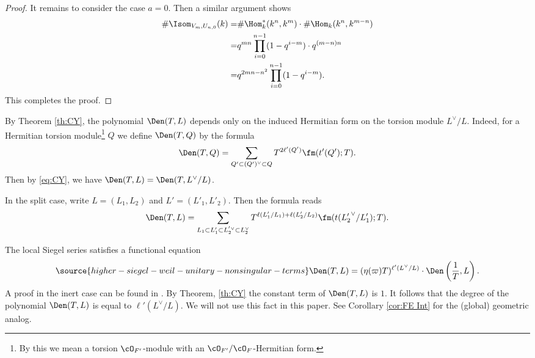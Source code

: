 \begin{proof}
It remains to consider the case $a=0$. Then  a similar argument shows
   \begin{align*}
 \# \Isom_{V_{m}, U_{n,0}}(k)= &\#\Hom^*_k(k^n,k^m)\cdot  \#\Hom_k(k^n,k^{m-n})\\
 =&q^{mn}\prod_{i=0}^{n-1}(1-q^{i-m})\cdot  q^{(m-n)n}
 \\=&  q^{2mn-n^2}\prod_{i=0}^{n-1}(1-q^{i-m}).
  \end{align*}
  This completes the proof.

 \end{proof}

 \begin{remark}
\notready\label{r:Den tor} By Theorem \ref{th:CY}, the polynomial $\Den(T,L)$ depends only on the induced Hermitian form on the torsion module $L^\vee/L$. Indeed, for a Hermitian torsion module\footnote{By this we mean a torsion $\cO_{F'}$-module with an $\cO_{F'}/\cO_F$-Hermitian form.} $Q$ we define $\Den(T,Q)$ by the formula
\[
\Den(T,Q) = \sum_{Q'\subset (Q')^{\vee} \subset Q} T^{2\ell'(Q')}\fm(  t'(Q');T).
\]
Then by \eqref{eq:CY}, we have $\Den(T, L) = \Den(T, L^\vee/L)$.
\end{remark}

\begin{remark}
\notready
In the split case, write $L=(L_1,L_2)$ and $L'=(L'_1,L'_2)$. Then the formula reads
\begin{eqnarray*}
\Den(T,L) = \sum_{L_1 \subset L'_1 \subset L_2^{'\vee} \subset L_2^{\vee}  } T^{\ell(L_1'/L_1)+\ell(L_2'/L_2)}\fm(t({L_2'}^{\vee}/L'_1);T).
\end{eqnarray*}
\end{remark}


\begin{remark}
\notready
\label{rem:local-siegel-functional-equation}
The local Siegel series satisfies a functional equation
\begin{equation}
  \label{eq:functionalequation}
\source{higher-siegel-weil-unitary-nonsingular-terms}
  \Den(T,L)=(\eta(\varpi) T)^{\ell'(L^\vee/L)}\cdot \Den\left(\frac{1}{T},L\right).
\end{equation}A proof in the inert case can be found in \cite[Theorem 5.3]{Hironaka2012}. By Theorem, \ref{th:CY} the constant term of $  \Den(T,L)$ is $1$. It follows that the degree of the polynomial $\Den(T,L)$ is equal to $\ell'(L^\vee/L)$. We will not use this fact in this paper.
See Corollary \ref{cor:FE Int} for the (global) geometric analog.
\end{remark}

